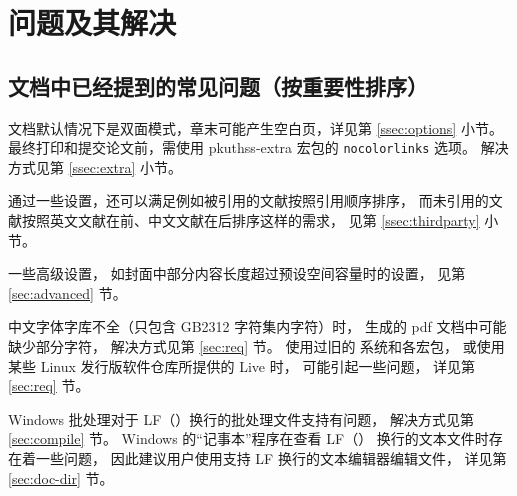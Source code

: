 %
%
%
%
%

\chapter{问题及其解决}
	\section{文档中已经提到的常见问题（按重要性排序）}

	文档默认情况下是双面模式，章末可能产生空白页，详见第 \ref{ssec:options} 小节。
	最终打印和提交论文前，需使用 pkuthss-extra 宏包的 \verb|nocolorlinks| 选项。
	解决方式见第 \ref{ssec:extra} 小节。

	通过一些设置，还可以满足例如被引用的文献按照引用顺序排序，
	而未引用的文献按照英文文献在前、中文文献在后排序这样的需求，
	见第 \ref{ssec:thirdparty} 小节。

	一些高级设置，
	如封面中部分内容长度超过预设空间容量时的设置，
	见第 \ref{sec:advanced} 节。

	中文字体字库不全（只包含 GB2312 字符集内字符）时，
	生成的 pdf 文档中可能缺少部分字符，
	解决方式见第 \ref{sec:req} 节。
	使用过旧的  系统和各宏包，
	或使用某些 Linux 发行版软件仓库所提供的  Live 时，
	可能引起一些问题，
	详见第 \ref{sec:req} 节。

	Windows 批处理对于 LF（\texttt{\string\n}）换行的批处理文件支持有问题，
	解决方式见第 \ref{sec:compile} 节。
	Windows 的“记事本”程序在查看 LF（\texttt{\string\n}）
	换行的文本文件时存在着一些问题，
	因此建议用户使用支持 LF 换行的文本编辑器编辑文件，
	详见第 \ref{sec:doc-dir} 节。

